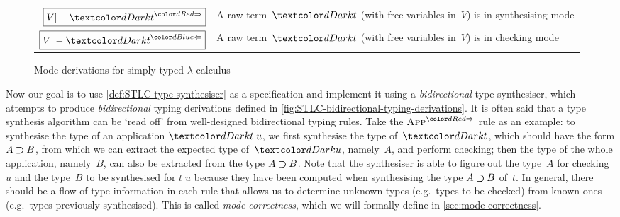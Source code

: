 \begin{figure}
  \centering
  \small
  \bgroup
  \renewcommand{\arraystretch}{1.5}
  \begin{tabular}{ r l }
    $\boxed{V |- \isTerm{t}^{\syn}}$ & A raw term~$\isTerm{t}$ (with free variables in~$V$) is in synthesising mode \\
    $\boxed{V |- \isTerm{t}^{\chk}}$ & A raw term~$\isTerm{t}$ (with free variables in~$V$) is in checking mode
  \end{tabular}
  \egroup
  \caption{Mode derivations for simply typed $\lambda$-calculus}
  \label{fig:STLC-mode-derivations}
\end{figure}
Now our goal is to use \cref{def:STLC-type-synthesiser} as a specification and implement it using a \emph{bidirectional} type synthesiser, which attempts to produce \emph{bidirectional} typing derivations defined in \cref{fig:STLC-bidirectional-typing-derivations}.
It is often said that a type synthesis algorithm can be `read off' from well-designed bidirectional typing rules.
Take the $\SynRule{App}$ rule as an example:
to synthesise the type of an application $\isTerm{t\;u}$, we first synthesise the type of~$\isTerm{t}$, which should have the form $A \mathbin{\bm{\supset}} B$, from which we can extract the expected type of~$\isTerm{u}$, namely~$A$, and perform checking; then the type of the whole application, namely~$B$, can also be extracted from the type $A \mathbin{\bm{\supset}} B$.
Note that the synthesiser is able to figure out the type~$A$ for checking~$u$ and the type~$B$ to be synthesised for $t\;u$ because they have been computed when synthesising the type $A \mathbin{\bm{\supset}} B$ of~$t$.
In general, there should be a flow of type information in each rule that allows us to determine unknown types (e.g.~types to be checked) from known ones (e.g.~types previously synthesised).
This is called \emph{mode-correctness}, which we will formally define in \cref{sec:mode-correctness}.

